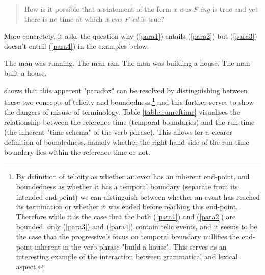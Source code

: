 \begin{quotation}
    How is it possible that a statement of the form \emph{x was F-ing} is true and yet there
    is no time at which \emph{x was F-ed} is true?
\end{quotation}
More concretely, it asks the question why (\ref{para1}) entails (\ref{para2}) but (\ref{para3}) doesn't entail (\ref{para4}) in the examples below:
\begin{exe}
    \ex The man was running.
    \label{para1}
    \ex The man ran.
    \label{para2}
    \ex The man was building a house.
    \label{para3}
    \ex The man built a house.
    \label{para4}
\end{exe}
\citet{6608d9d0-a477-39af-8491-2172df5ae612} shows that this apparent "paradox" can be resolved by distinguishing between these two concepts of telicity and boundedness,\footnote{By definition of telicity as whether an even has an inherent end-point, and boundedness as whether it has a temporal boundary (separate from its intended end-point) we can distinguish between whether an event has reached its termination or whether it was ended before reaching this end-point. Therefore while it is the case that the both (\ref{para1}) and (\ref{para2}) are bounded, only (\ref{para3}) and (\ref{para4}) contain telic events, and it seems to be the case that the progressive's focus on temporal boundary nullifies the end-point inherent in the verb phrase "build a house". This serves as an interesting example of the interaction between grammatical and lexical aspect.} and this further serves to show the dangers of misuse of terminology. Table \ref{table:runreftime} visualises the relationship between the reference time (temporal boundaries) and the run-time (the inherent "time schema" of the verb phrase). This allows for a clearer definition of boundedness, namely whether the right-hand side of the run-time boundary lies within the reference time or not.


